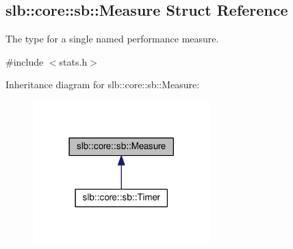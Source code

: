 \hypertarget{structslb_1_1core_1_1sb_1_1Measure}{}\subsection{slb\+:\+:core\+:\+:sb\+:\+:Measure Struct Reference}
\label{structslb_1_1core_1_1sb_1_1Measure}


The type for a single named performance measure.  




{\ttfamily \#include $<$stats.\+h$>$}



Inheritance diagram for slb\+:\+:core\+:\+:sb\+:\+:Measure\+:\nopagebreak
\begin{figure}[H]
\begin{center}
\leavevmode
\includegraphics[width=194pt]{structslb_1_1core_1_1sb_1_1Measure__inherit__graph}
\end{center}
\end{figure}

